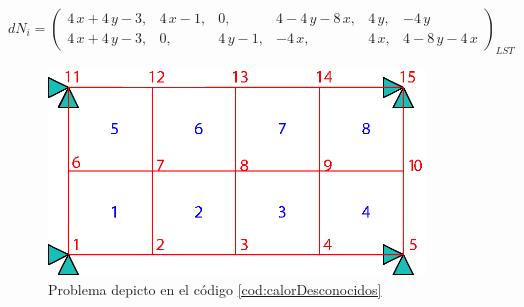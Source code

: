 $$
dN_i=\left(\begin{array}{cccccc} 4\,x+4\,y-3, & 4\,x-1, & 0, & 4-4\,y-8\,x, & 4\,y, & -4\,y\\ 4\,x+4\,y-3, & 0, & 4\,y-1, & -4\,x, & 4\,x, & 4-8\,y-4\,x \end{array}\right)_{LST}
$$
\begin{figure}
    \centering
    \includegraphics[width=10cm]{fig/problema_calor.eps}
    \caption{Problema depicto en el código \ref{cod:calorDesconocidos}}
    \label{fig:probCalor}
\end{figure}